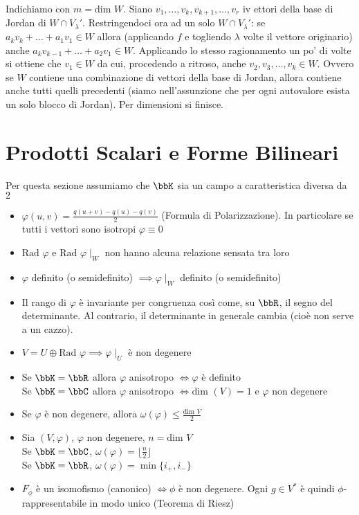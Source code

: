\documentclass[a4paper,NoNotes]{stdmdoc}
\newcommand{\Dim}{\mbox{dim }}
\newcommand{\Rad}{\mbox{Rad }}
\newcommand{\sse}{\Leftrightarrow}
\newcommand{\floor}[1]{\lfloor #1 \rfloor}
\begin{document}
\begin{itemize}
		Indichiamo con $m = \Dim W$. Siano $v_1, \ldots, v_k, v_{k+1}, \ldots, v_{r}$ iv ettori della base di Jordan di $W \cap V_{\lambda}'$. Restringendoci ora ad un solo $W \cap V_{\lambda}'$: se $a_kv_k+\ldots+a_1v_1 \in W$ allora (applicando $f$ e togliendo $\lambda$ volte il vettore originario) anche $a_kv_{k-1}+\ldots+a_2v_1 \in W$. Applicando lo stesso ragionamento un po' di volte si ottiene che $v_1 \in W$ da cui, procedendo a ritroso, anche $v_2, v_3, \ldots, v_k \in W$. Ovvero se $W$ contiene una combinazione di vettori della base di Jordan, allora contiene anche tutti quelli precedenti (siamo nell'assunzione che per ogni autovalore esista un solo blocco di Jordan). Per dimensioni si finisce.
	\end{itemize}

	\section*{Prodotti Scalari e Forme Bilineari}
	\Achtung Per questa sezione assumiamo che $\bbK$ sia un campo a caratteristica diversa da $2$
	\begin{itemize}
		\item $\varphi(u,v) = \frac{q(u+v)-q(u)-q(v)}{2}$ (Formula di Polarizzazione). In particolare se tutti i vettori sono isotropi $\varphi \equiv 0$
		\item $\Rad\varphi$ e $\Rad\varphi\mid_W$ non hanno alcuna relazione sensata tra loro
		\item $\varphi$ definito (o semidefinito) $\implies \varphi\mid_W$ definito (o semidefinito)
		\item Il rango di $\varphi$ è invariante per congruenza così come, su $\bbR$, il segno del determinante. Al contrario, il determinante in generale cambia (cioè non serve a un cazzo).
		\item $V = U \oplus \Rad\varphi \implies \varphi\mid_U$ è non degenere
		\item Se $\bbK = \bbR$ allora $\varphi$ anisotropo $\sse \varphi$ è definito \\ Se $\bbK = \bbC$ allora $\varphi$ anisotropo $\sse \Dim(V) = 1$ e $\varphi$ non degenere
	\end{itemize}
	\begin{itemize}
		\item Se $\varphi$ è non degenere, allora $\omega(\varphi) \le \frac{\Dim V}{2}$
		\item Sia $(V, \varphi)$, $\varphi$ non degenere, $n = \Dim V$ \\ Se $\bbK = \bbC$, $\omega(\varphi) = \floor{\frac{n}{2}}$ \\ Se $\bbK = \bbR$, $\omega(\varphi) = \min\{i_{+}, i_{-}\}$
		\item $F_\phi$ è un isomofismo (canonico) $\sse \phi$ è non degenere. Ogni $g \in V^{*}$ è quindi $\phi$-rappresentabile in modo unico (Teorema di Riesz)
	\end{itemize}
\end{document}
